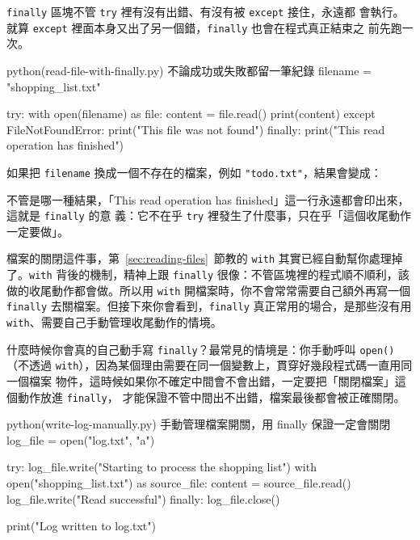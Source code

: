 \texttt{finally} 區塊不管 \texttt{try} 裡有沒有出錯、有沒有被 \texttt{except} 接住，永遠都
會執行。
就算 \texttt{except} 裡面本身又出了另一個錯，\texttt{finally} 也會在程式真正結束之
前先跑一次。

\begin{example}{python}{(read-file-with-finally.py) 不論成功或失敗都留一筆紀錄}
filename = "shopping_list.txt"

try:
    with open(filename) as file:
        content = file.read()
    print(content)
except FileNotFoundError:
    print("This file was not found")
finally:
    print("This read operation has finished")
\end{example}


如果把 \texttt{filename} 換成一個不存在的檔案，例如 \texttt{"todo.txt"}，結果會變成：


不管是哪一種結果，「This read operation has finished」這一行永遠都會印出來，這就是 \texttt{finally} 的意
義：它不在乎 \texttt{try} 裡發生了什麼事，只在乎「這個收尾動作一定要做」。

檔案的關閉這件事，第~\ref{sec:reading-files}~節教的 \texttt{with} 其實已經自動幫你處理掉
了。\texttt{with} 背後的機制，精神上跟 \texttt{finally} 很像：不管區塊裡的程式順不順利，該
做的收尾動作都會做。所以用 \texttt{with} 開檔案時，你不會常常需要自己額外再寫一個
\texttt{finally} 去關檔案。但接下來你會看到，\texttt{finally} 真正常用的場合，是那些沒有用
\texttt{with}、需要自己手動管理收尾動作的情境。

什麼時候你會真的自己動手寫 \texttt{finally}？最常見的情境是：你手動呼叫 \texttt{open()}
（不透過 \texttt{with}），因為某個理由需要在同一個變數上，貫穿好幾段程式碼一直用同一個檔案
物件，這時候如果你不確定中間會不會出錯，一定要把「關閉檔案」這個動作放進 \texttt{finally}，
才能保證不管中間出不出錯，檔案最後都會被正確關閉。

\begin{example}{python}{(write-log-manually.py) 手動管理檔案開關，用 finally 保證一定會關閉}
log_file = open("log.txt", "a")

try:
    log_file.write("Starting to process the shopping list\n")
    with open("shopping_list.txt") as source_file:
        content = source_file.read()
    log_file.write("Read successful\n")
finally:
    log_file.close()

print("Log written to log.txt")
\end{example}

